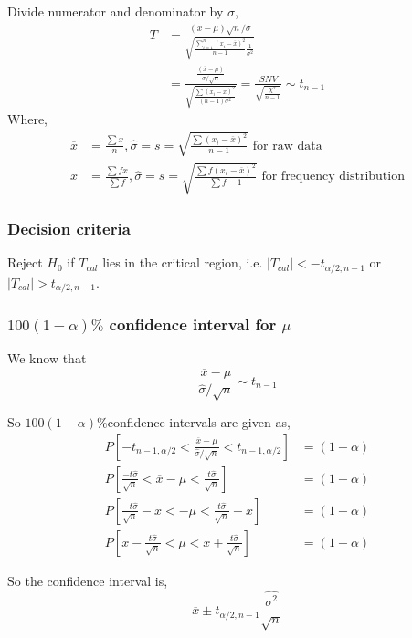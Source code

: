 \documentclass[oneside,11pt,pdftex]{book}%
\numberwithin{equation}{section}
\numberwithin{section}{chapter}
\numberwithin{equation}{chapter}
\begin{document}
Divide numerator and denominator by $ \sigma  $,
\begin{align*}
	T&=\frac{(x-\mu)\sqrt{n}/\sigma }{\sqrt{\frac{\sum_{i=1}^n (x_i-\overline{x})^2}{n-1} \frac{1}{\sigma^2}} }\\
	&=\frac{\frac{(\overline{x}-\mu )}{\sigma/\sqrt{n}}}{\sqrt{\frac{\sum (x_i-\overline{x})^2}{(n-1)\sigma^2}}}=\frac{SNV}{\sqrt{\frac{\chi^2}{n-1}}}\sim t_{n-1}
\end{align*}
Where, \begin{align*}
	\overline{x}&=\frac{\sum x}{n}, \hat{\sigma }=s=\sqrt{\frac{\sum(x_i-\overline{x})^2}{n-1}} \text{ for raw data}\\
	\overline{x}&=\frac{\sum fx}{\sum f}, \hat{\sigma }=s=\sqrt{\frac{\sum f(x_i-\overline{x})^2}{\sum f-1}} \text{ for frequency distribution}
\end{align*}
\subsubsection{Decision criteria}
Reject $ H_0 $ if $ T_{cal} $ lies in the critical region, i.e. $ |T_{cal}| <-t_{\alpha/2, n-1}  $ or $ |T_{cal}|>t_{\alpha/2, n-1} $.

\subsubsection{$ 100(1-\alpha)\% $ confidence interval for $ \mu $}
We know that \[ \frac{\overline{x}-\mu }{\hat{\sigma}/\sqrt{n}}\sim t_{n-1} \]

So $ 100(1-\alpha)\% $confidence intervals are given as,
\begin{align*}
	P\left[-t_{n-1, \alpha/2} < \frac{\overline{x}-\mu }{\hat{\sigma} / \sqrt{n}} < t_{n-1, \alpha/2}\right]&=(1-\alpha)\\
	P\left[\frac{-t \hat{\sigma}}{\sqrt{n}} < \overline{x}- \mu < \frac{t \hat{\sigma }}{\sqrt{n}}\right]&=(1-\alpha)\\
	P\left[\frac{-t \hat{\sigma}}{\sqrt{n}} - \overline{x}< - \mu < \frac{t \hat{\sigma }}{\sqrt{n}}-\overline{x}\right]&=(1-\alpha)\\
	P\left[\overline{x}- \frac{t \hat{\sigma }}{\sqrt{n}} < \mu < \overline{x}+\frac{t\hat{\sigma }}{\sqrt{n}}\right]&=(1-\alpha)
\end{align*}

So the confidence interval is,
\[ \overline{x} \pm t_{\alpha/2, n-1} \frac{\hat{\sigma^2}}{\sqrt{n}}\]
\end{document}
